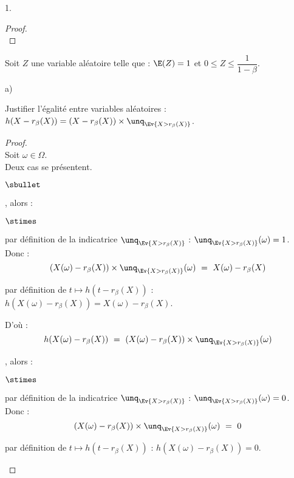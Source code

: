 \documentclass[11pt]{article}%
\begin{document}
\begin{noliste}{1.}
\begin{proof}
      
      
      
      ~\\[-1.4cm]
  \end{proof}
  
  \item Soit $Z$ une variable aléatoire telle que : 
  $\E(Z)=1$ et $0\leq Z \leq \dfrac1{1-\beta}$.
  \begin{noliste}{a)}
    \setlength{\itemsep}{2mm}
    \item Justifier l'égalité entre variables aléatoires : 
    $h(X-r_\beta(X))=(X-r_\beta(X)) \times \unq_{\Ev{X > 
    r_\beta(X)}}$.
    
    \begin{proof}~\\
      Soit $\omega \in \Omega$.\\
      Deux cas se présentent.
      \begin{noliste}{$\sbullet$}
	\item {}, alors :
	\begin{noliste}{$\stimes$}
	  \item par définition de la \var indicatrice $\unq_{\Ev{ X >
	  r_\beta(X)}}$ : $\unq_{\Ev{ X> r_\beta(X)}}(\omega) = 1$.\\
	  Donc :
	  \[
	    (X(\omega) - r_\beta(X)) \times \unq_{\Ev{ X > r_\beta(X)}}
	    (\omega) \ = \ X(\omega) - r_\beta(X)
	  \]
	  
	  \item par définition de $t \mapsto h(t- r_\beta(X))$ : 
	  $h(X(\omega) - r_\beta(X)) = X(\omega) - r_\beta(X)$.
	\end{noliste}
	D'où :
	\[
	  h(X(\omega) - r_\beta(X)) \ = \ (X(\omega) - r_\beta(X))
	  \times \unq_{\Ev{ X> r_\beta(X)}}(\omega)
	\]
	
	\item {}, alors :
	\begin{noliste}{$\stimes$}
	  \item par définition de la \var indicatrice $\unq_{\Ev{ X >
	  r_\beta(X)}}$ : $\unq_{\Ev{ X> r_\beta(X)}}(\omega) = 0$.\\
	  Donc :
	  \[
	    (X(\omega) - r_\beta(X)) \times \unq_{\Ev{ X > r_\beta(X)}}
	    (\omega) \ = \ 0
	  \]
	  
	  \item par définition de $t \mapsto h(t- r_\beta(X))$ : 
	  $h(X(\omega) - r_\beta(X)) = 0$.
	\end{noliste}
	

\end{noliste}
\end{proof}
\end{noliste}
\end{noliste}
\end{document}
